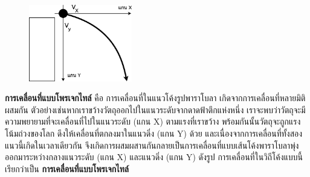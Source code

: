 \begin{figure}
  \vspace{-20pt}
  \begin{center}
    \includegraphics[width=0.4\textwidth]{content-8.eps}
  \end{center}
  \vspace{-20pt}
  \vspace{-10pt}
\end{figure}
\textbf{การเคลื่อนที่แบบโพรเจกไทล์}  คือ การเคลื่อนที่ในแนวโค้งรูปพาราโบลา  เกิดจากการเคลื่อนที่หลายมิติผสมกัน  ตัวอย่างเช่นหากเราขว้างวัตถุออกไปในแนวระดับจากดาดฟ้าตึกแห่งหนึ่ง  เราจะพบว่าวัตถุจะมีความพยายามที่จะเคลื่อนที่ไปในแนวระดับ (แกน X) ตามแรงที่เราขว้าง  พร้อมกันนั้นวัตถุจะถูกแรงโน้มถ่วงของโลก  ดึงให้เคลื่อนที่ตกลงมาในแนวดิ่ง (แกน Y) ด้วย    และเนื่องจากการเคลื่อนที่ทั้งสองแนวนี้เกิดในเวลาเดียวกัน      จึงเกิดการผสมผสานกันกลายเป็นการเคลื่อนที่แบบเส้นโค้งพาราโบลาพุ่งออกมาระหว่างกลางแนวระดับ (แกน X)  และแนวดิ่ง (แกน Y) ดังรูป  การเคลื่อนที่ในวิถีโค้งแบบนี้เรียกว่าเป็น \textbf{การเคลื่อนที่แบบโพรเจกไทล์}
